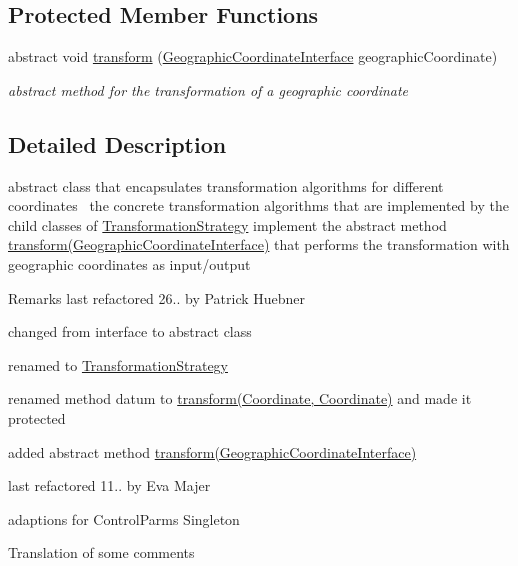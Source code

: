 \subsection*{Protected Member Functions}
\begin{DoxyCompactItemize}
\item 
abstract void \hyperlink{classdatumstrategy_1_1_transformation_strategy_a0fd1d6fbba01e5222360740e34eae786}{transform} (\hyperlink{classcoordinates_1_1_geographic_coordinate_interface}{Geographic\+Coordinate\+Interface} geographic\+Coordinate)
\begin{DoxyCompactList}\small\item\em abstract method for the transformation of a geographic coordinate \end{DoxyCompactList}\end{DoxyCompactItemize}


\subsection{Detailed Description}
abstract class that encapsulates transformation algorithms for different coordinates~\newline
 the concrete transformation algorithms that are implemented by the child classes of \hyperlink{classdatumstrategy_1_1_transformation_strategy}{Transformation\+Strategy} implement the abstract method \hyperlink{classdatumstrategy_1_1_transformation_strategy_a0fd1d6fbba01e5222360740e34eae786}{transform(\+Geographic\+Coordinate\+Interface)} that performs the transformation with geographic coordinates as input/output 

\begin{DoxyRemark}{Remarks}
last refactored 26.. by Patrick Huebner ~\newline
 
\begin{DoxyItemize}
\item changed from interface to abstract class 
\item renamed to \hyperlink{classdatumstrategy_1_1_transformation_strategy}{Transformation\+Strategy} 
\item renamed method datum to \hyperlink{classdatumstrategy_1_1_transformation_strategy_a99e23d291f37ed720a9e31d33f54c834}{transform(\+Coordinate, Coordinate)} and made it protected 
\item added abstract method \hyperlink{classdatumstrategy_1_1_transformation_strategy_a0fd1d6fbba01e5222360740e34eae786}{transform(\+Geographic\+Coordinate\+Interface)} 
\end{DoxyItemize}

last refactored 11.. by Eva Majer ~\newline
 
\begin{DoxyItemize}
\item adaptions for Control\+Parms Singleton 
\item Translation of some comments 
\end{DoxyItemize}
\end{DoxyRemark}



